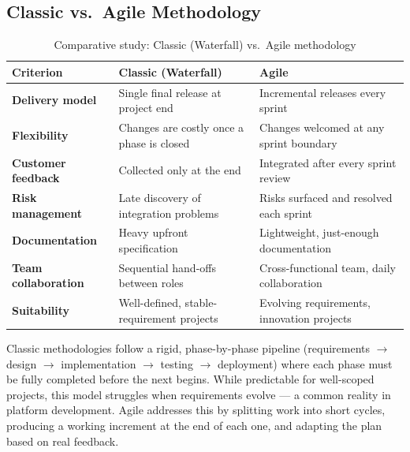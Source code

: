 \subsection{Classic vs.\ Agile Methodology}

\begin{table}[H]
\centering
\caption{Comparative study: Classic (Waterfall) vs.\ Agile methodology}
\label{tab:method_compare}
\renewcommand{\arraystretch}{1.25}
\begin{tabularx}{\textwidth}{>{\bfseries}lXX}
\toprule
Criterion & Classic (Waterfall) & Agile \\
\midrule
Delivery model    & Single final release at project end              & Incremental releases every sprint \\
Flexibility       & Changes are costly once a phase is closed        & Changes welcomed at any sprint boundary \\
Customer feedback & Collected only at the end                        & Integrated after every sprint review \\
Risk management   & Late discovery of integration problems           & Risks surfaced and resolved each sprint \\
Documentation     & Heavy upfront specification                      & Lightweight, just-enough documentation \\
Team collaboration & Sequential hand-offs between roles              & Cross-functional team, daily collaboration \\
Suitability       & Well-defined, stable-requirement projects        & Evolving requirements, innovation projects \\
\bottomrule
\end{tabularx}
\end{table}

Classic methodologies follow a rigid, phase-by-phase pipeline (requirements $\rightarrow$ design
$\rightarrow$ implementation $\rightarrow$ testing $\rightarrow$ deployment) where each phase must
be fully completed before the next begins. While predictable for well-scoped projects, this model
struggles when requirements evolve — a common reality in platform development. Agile addresses
this by splitting work into short cycles, producing a working increment at the end of each one,
and adapting the plan based on real feedback.


